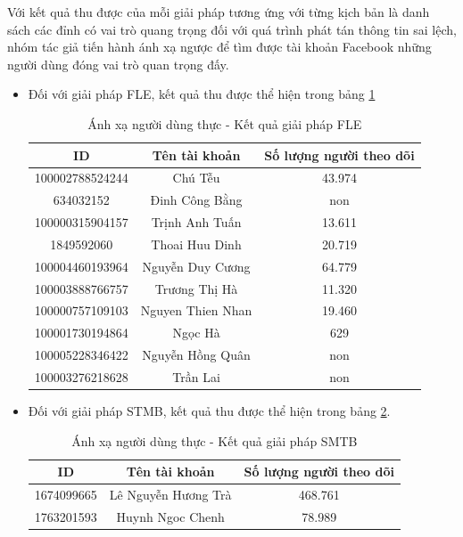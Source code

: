 Với kết quả thu được của mỗi giải pháp tương ứng với từng kịch bản là danh sách các đỉnh có vai trò quang trọng đối với quá trình phát tán thông tin sai lệch, nhóm tác giả tiến hành ánh xạ ngược để tìm được tài khoản Facebook những người dùng đóng vai trò quan trọng đấy.

\begin{itemize}
	\item Đối với giải pháp FLE, kết quả thu được thể hiện trong bảng \ref{anhxafle}
	\begin{table} [H]
		\centering
		\begin{tabular}{|c|c|c|}
			\hline
			ID & Tên tài khoản & Số lượng người theo dõi\\
			\hline
			100002788524244 & Chú Tễu & 43.974\\
			\hline
			634032152 & Đinh Công Bằng & non\\
			\hline
			100000315904157 & Trịnh Anh Tuấn & 13.611\\
			\hline
			1849592060 & Thoai Huu Dinh & 20.719\\
			\hline
			100004460193964 & Nguyễn Duy Cương & 64.779\\
			\hline
			100003888766757 & Trương Thị Hà & 11.320\\
			\hline 
			100000757109103 & Nguyen Thien Nhan & 19.460\\
			\hline 
			100001730194864 & Ngọc Hà & 629\\
			\hline
			100005228346422 & Nguyễn Hồng Quân & non\\
			\hline
			100003276218628 & Trần Lai & non\\
			\hline
		\end{tabular}
		\caption{Ánh xạ người dùng thực - Kết quả giải pháp FLE}
		\label{anhxafle} 
	\end{table}
	
	\item Đối với giải pháp STMB, kết quả thu được thể hiện trong bảng \ref{anhxastmb}.
	
	\begin{table} [H]
		\centering
		\begin{tabular}{|c|c|c|}
			\hline
			ID & Tên tài khoản & Số lượng người theo dõi\\
			\hline
			1674099665 & Lê Nguyễn Hương Trà & 468.761\\
			\hline
			1763201593 & Huynh Ngoc Chenh & 78.989\\
			\hline
		\end{tabular}
		\caption{Ánh xạ người dùng thực - Kết quả giải pháp SMTB}
		\label{anhxastmb} 
	\end{table}
	
\end{itemize}

